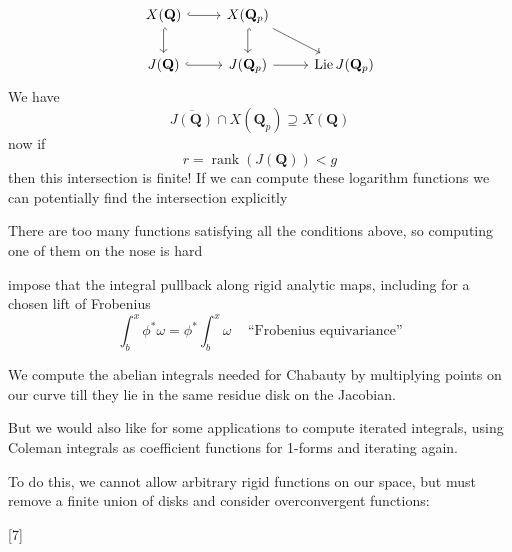 \documentclass[oneside,11pt,]{article}
\let\emph\relax %
\begin{document}
\[\begin{tikzcd}
	{X(\mathbf Q)} & {X(\mathbf Q_p)} \\
    {J(\mathbf Q)} & {J(\mathbf Q_p)} & {\operatorname{Lie} J (\mathbf Q_p)}
	\arrow[hook, from=1-1, to=1-2]
	\arrow[hook, from=1-1, to=2-1]
	\arrow[hook, from=1-2, to=2-2]
	\arrow[hook, from=2-1, to=2-2]
	\arrow[from=1-2, to=2-3]
	\arrow[from=2-2, to=2-3]
\end{tikzcd}\]
We have
\[\overline {J(\mathbf Q)} \cap X(\mathbf Q_p) \supseteq X(\mathbf Q)\]
now if \[r = \operatorname{rank}(J(\mathbf Q)) < g\] then this intersection is finite!
If we can compute these logarithm functions we can potentially find the intersection explicitly

\emph{Problem:} There are too many functions satisfying all the conditions above, so computing one of them on the nose is hard

\emph{Coleman's idea:} impose that the integral pullback along rigid analytic maps, including for a chosen lift of Frobenius
\[\int_b^x \phi^*\omega = \phi^*\int_b^x \omega\,\quad\text{``Frobenius equivariance''}\]%

We \emph{can} compute the abelian integrals needed for Chabauty by multiplying points on our curve till they lie in the same residue disk on the Jacobian.

But we would also like for some applications to compute iterated integrals, using Coleman integrals as coefficient functions for 1-forms and iterating again.

To do this, we cannot allow arbitrary rigid functions on our space, but must remove a finite union of disks and consider overconvergent functions:

   [7]
\end{document}
